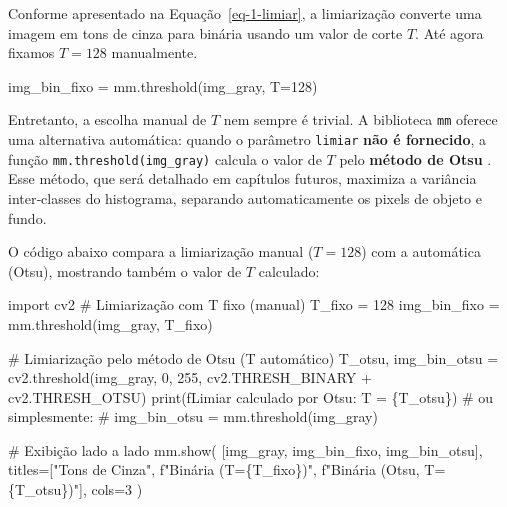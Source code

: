 \documentclass[
  portuguese,
  letterpaper,
  openany,
  oneside,
  12pt,
  a4paper]{book}
\newenvironment{Shaded}{\begin{snugshade}}{\end{snugshade}}
\newcommand{\BuiltInTok}[1]{\textcolor[rgb]{0.00,0.23,0.31}{#1}}
\newcommand{\CommentTok}[1]{\textcolor[rgb]{0.37,0.37,0.37}{#1}}
\newcommand{\DecValTok}[1]{\textcolor[rgb]{0.68,0.00,0.00}{#1}}
\newcommand{\ImportTok}[1]{\textcolor[rgb]{0.00,0.46,0.62}{#1}}
\newcommand{\NormalTok}[1]{\textcolor[rgb]{0.00,0.23,0.31}{#1}}
\newcommand{\OperatorTok}[1]{\textcolor[rgb]{0.37,0.37,0.37}{#1}}
\newcommand{\SpecialCharTok}[1]{\textcolor[rgb]{0.37,0.37,0.37}{#1}}
\newcommand{\SpecialStringTok}[1]{\textcolor[rgb]{0.13,0.47,0.30}{#1}}
\newcommand{\StringTok}[1]{\textcolor[rgb]{0.13,0.47,0.30}{#1}}
\begin{document}
Conforme apresentado na Equação~\ref{eq-1-limiar}, a limiarização
converte uma imagem em tons de cinza para binária usando um valor de
corte \(T\). Até agora fixamos \(T = 128\) manualmente.

\begin{Shaded}
\begin{Highlighting}[]
\NormalTok{img\_bin\_fixo }\OperatorTok{=}\NormalTok{ mm.threshold(img\_gray, T}\OperatorTok{=}\DecValTok{128}\NormalTok{)}
\end{Highlighting}
\end{Shaded}

Entretanto, a escolha manual de \(T\) nem sempre é trivial. A biblioteca
\texttt{mm} oferece uma alternativa automática: quando o parâmetro
\texttt{limiar} \textbf{não é fornecido}, a função
\texttt{mm.threshold(img\_gray)} calcula o valor de \(T\) pelo
\textbf{método de Otsu} \autocite{otsu1979}. Esse método, que será
detalhado em capítulos futuros, maximiza a variância inter‑classes do
histograma, separando automaticamente os pixels de objeto e fundo.

O código abaixo compara a limiarização manual (\(T=128\)) com a
automática (Otsu), mostrando também o valor de \(T\) calculado:

\begin{Shaded}
\begin{Highlighting}[]
\ImportTok{import}\NormalTok{ cv2}
\CommentTok{\# Limiarização com T fixo (manual)}
\NormalTok{T\_fixo }\OperatorTok{=} \DecValTok{128}
\NormalTok{img\_bin\_fixo }\OperatorTok{=}\NormalTok{ mm.threshold(img\_gray, T\_fixo)}

\CommentTok{\# Limiarização pelo método de Otsu (T automático)}
\NormalTok{T\_otsu, img\_bin\_otsu }\OperatorTok{=}\NormalTok{ cv2.threshold(img\_gray, }\DecValTok{0}\NormalTok{, }\DecValTok{255}\NormalTok{,}
\NormalTok{                                      cv2.THRESH\_BINARY }\OperatorTok{+}\NormalTok{ cv2.THRESH\_OTSU)}
\BuiltInTok{print}\NormalTok{(}\SpecialStringTok{f\textquotesingle{}Limiar calculado por Otsu: T = }\SpecialCharTok{\{}\NormalTok{T\_otsu}\SpecialCharTok{\}}\SpecialStringTok{\textquotesingle{}}\NormalTok{)}
\CommentTok{\# ou simplesmente:}
\CommentTok{\# img\_bin\_otsu = mm.threshold(img\_gray)}

\CommentTok{\# Exibição lado a lado}
\NormalTok{mm.show(}
\NormalTok{    [img\_gray, img\_bin\_fixo, img\_bin\_otsu], }
\NormalTok{    titles}\OperatorTok{=}\NormalTok{[}\StringTok{"Tons de Cinza"}\NormalTok{, }\SpecialStringTok{f"Binária (T=}\SpecialCharTok{\{}\NormalTok{T\_fixo}\SpecialCharTok{\}}\SpecialStringTok{)"}\NormalTok{, }\SpecialStringTok{f"Binária (Otsu, T=}\SpecialCharTok{\{}\NormalTok{T\_otsu}\SpecialCharTok{\}}\SpecialStringTok{)"}\NormalTok{],}
\NormalTok{    cols}\OperatorTok{=}\DecValTok{3}
\NormalTok{)}
\end{Highlighting}
\end{Shaded}
\end{document}
